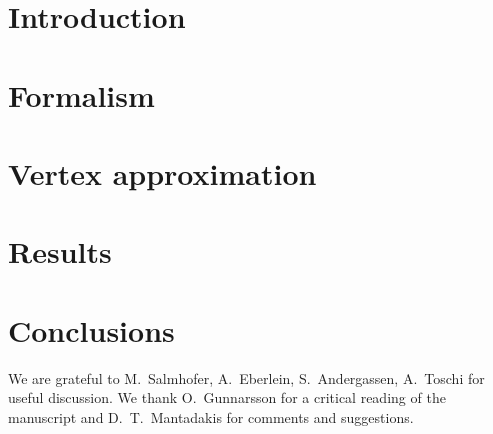 \documentclass[aps,prb,twocolumn,showpacs,groupedaddress]{revtex4-1}
\begin{document}
\section{Introduction}
\label{sec:introduction}


\section{Formalism}
\label{sec:formalism}

\section{Vertex approximation}
\label{sec:vertex}


\section{Results}
\label{sec:results}


\section{Conclusions}
\label{sec:conclusions}


\vspace*{5mm}
\begin{acknowledgments} 
We are grateful to M.~Salmhofer, A.~Eberlein, S.~Andergassen, A.~Toschi for useful discussion. 
We thank O.~Gunnarsson for a critical reading of the manuscript and D.~T.~Mantadakis for comments and suggestions. 
\end{acknowledgments}

\begin{appendix}

\end{appendix}


%

\end{document}
